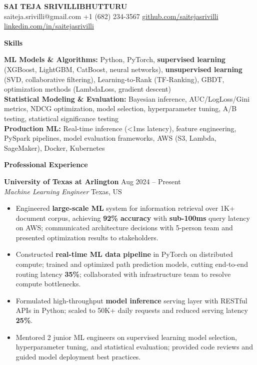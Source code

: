 \documentclass[10pt, letterpaper]{article}
\newcommand{\mysection}[1]{%
  \vspace{10pt}%
  {\noindent\large\bfseries #1}%
  \vspace{4pt}{\hrule}%
  \vspace{6pt}%
}
\newcommand{\resumeItem}[1]{\item\small{#1}}
\begin{document}
\begin{center}
  {\LARGE\textbf{SAI TEJA SRIVILLIBHUTTURU}} \\[2pt]
  \small
  saiteja.srivilli@gmail.com \quad +1 (682) 234-3567 \quad
  \href{https://github.com/saitejasrivilli}{github.com/saitejasrivilli} \quad
  \href{https://linkedin.com/in/saitejasrivilli}{linkedin.com/in/saitejasrivilli}
\end{center}
\vspace{-3mm}

\mysection{Skills}
\small
\noindent\textbf{ML Models \& Algorithms:} Python, PyTorch, \textbf{supervised learning} (XGBoost, LightGBM, CatBoost, neural networks), \textbf{unsupervised learning} (SVD, collaborative filtering), Learning-to-Rank (TF-Ranking), GBDT, optimization methods (LambdaLoss, gradient descent) \\
\noindent\textbf{Statistical Modeling \& Evaluation:} Bayesian inference, AUC/LogLoss/Gini metrics, NDCG optimization, model selection, hyperparameter tuning, A/B testing, statistical significance testing \\
\noindent\textbf{Production ML:} Real-time inference (\textless{}1ms latency), feature engineering, PySpark pipelines, model evaluation frameworks, AWS (S3, Lambda, SageMaker), Docker, Kubernetes

\vspace{-3mm}
\mysection{Professional Experience}

\noindent\textbf{University of Texas at Arlington} \hfill Aug 2024 -- Present \\
\textit{Machine Learning Engineer} \hfill Texas, US
\begin{itemize}
  \resumeItem{Engineered \textbf{large-scale ML} system for information retrieval over 1K+ document corpus, achieving \textbf{92\% accuracy} with \textbf{sub-100ms} query latency on AWS; communicated architecture decisions with 5-person team and presented optimization results to stakeholders.}
  \resumeItem{Constructed \textbf{real-time ML data pipeline} in PyTorch on distributed compute; trained and optimized path prediction models, cutting end-to-end routing latency \textbf{35\%}; collaborated with infrastructure team to resolve compute bottlenecks.}
  \resumeItem{Formulated high-throughput \textbf{model inference} serving layer with RESTful APIs in Python; scaled to 50K+ daily requests and reduced serving latency \textbf{25\%}.}
  \resumeItem{Mentored 2 junior ML engineers on supervised learning model selection, hyperparameter tuning, and statistical evaluation; provided code reviews and guided model deployment best practices.}
\end{itemize}
\end{document}
